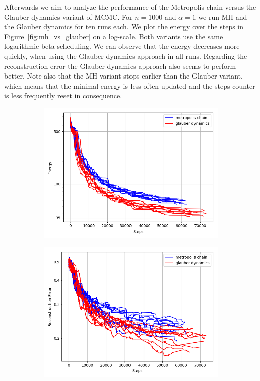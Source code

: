 \documentclass{scrartcl}
\begin{document}
Afterwards we aim to analyze the performance of the Metropolis chain versus the Glauber dynamics variant of MCMC. For $n=1000$ and $\alpha = 1$ we run MH and the Glauber dynamics for ten runs each. We plot the energy over the steps in Figure~\ref{fig:mh_vs_glauber} on a log-scale. Both variants use the same logarithmic beta-scheduling. We can observe that the energy decreases more quickly, when using the Glauber dynamics approach in all runs. Regarding the reconstruction error the Glauber dynamics approach also seems to perform better. Note also that the MH variant stops earlier than the Glauber variant, which means that the minimal energy is less often updated and the steps counter is less frequently reset in consequence.

\begin{figure}[h]
    \centering
    \begin{subfigure}{0.49\textwidth}
        \includegraphics[width=\textwidth]{energy_comp.png}
    \end{subfigure}
    \begin{subfigure}{0.49\textwidth}
        \includegraphics[width=\textwidth]{reconstruction_comp.png}

\end{subfigure}
\end{figure}
\end{document}
